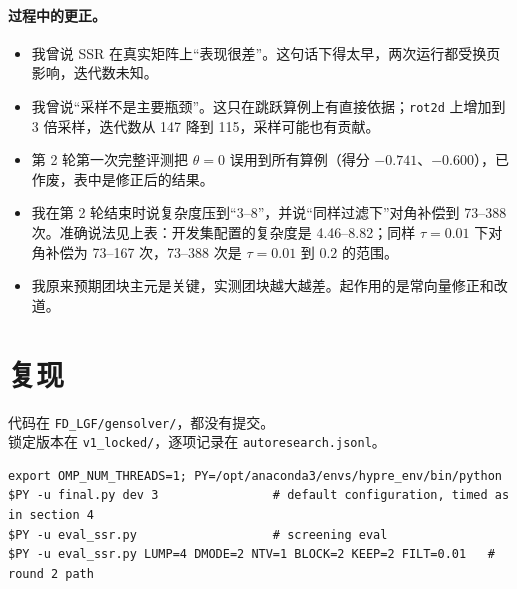 \documentclass[11pt,a4paper]{ctexart}
\begin{document}
\paragraph{过程中的更正。}
\begin{itemize}
\item 我曾说 SSR 在真实矩阵上“表现很差”。这句话下得太早，两次运行都受换页影响，迭代数未知。
\item 我曾说“采样不是主要瓶颈”。这只在跳跃算例上有直接依据；\texttt{rot2d} 上增加到 3 倍采样，迭代数从 147 降到 115，采样可能也有贡献。
\item 第 2 轮第一次完整评测把 $\theta=0$ 误用到所有算例（得分 $-0.741$、$-0.600$），已作废，表中是修正后的结果。
\item 我在第 2 轮结束时说复杂度压到“3--8”，并说“同样过滤下”对角补偿到 73--388 次。准确说法见上表：开发集配置的复杂度是 4.46--8.82；同样 $\tau=0.01$ 下对角补偿为 73--167 次，73--388 次是 $\tau=0.01$ 到 $0.2$ 的范围。
\item 我原来预期团块主元是关键，实测团块越大越差。起作用的是常向量修正和改道。
\end{itemize}

\section{复现}
代码在 \texttt{FD\_LGF/gensolver/}，都没有提交。\\ 锁定版本在 \texttt{v1\_locked/}，逐项记录在 \texttt{autoresearch.jsonl}。

\medskip\noindent\begin{minipage}{\textwidth}\footnotesize
\begin{verbatim}
export OMP_NUM_THREADS=1; PY=/opt/anaconda3/envs/hypre_env/bin/python
$PY -u final.py dev 3                # default configuration, timed as in section 4
$PY -u eval_ssr.py                   # screening eval
$PY -u eval_ssr.py LUMP=4 DMODE=2 NTV=1 BLOCK=2 KEEP=2 FILT=0.01   # round 2 path
\end{verbatim}
\end{minipage}
\end{document}
